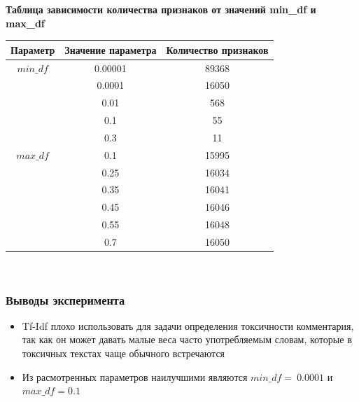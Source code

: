 \begin{center}
	{\bf Таблица зависимости количества признаков от значений min\_df и max\_df}\\
\end{center}

\begin{tabular}{|c|c|c||}
	\hline
		Параметр & Значение параметра & Количество признаков \\
	\hline
	\hline
		$min\_df$
		& 0.00001 & 89368	\\ \cline{2-3}
		& 0.0001 & 16050	\\\cline{2-3}
		& 0.01 & 568		\\\cline{2-3}
		& 0.1 & 55			\\\cline{2-3}
		& 0.3&  11			\\\cline{2-3}
	\hline
	\hline
	\hline
		$max\_df$
		& 0.1 & 15995		\\ \cline{2-3}
		& 0.25 & 16034		\\\cline{2-3}
		& 0.35 & 16041		\\\cline{2-3}
		& 0.45 & 16046		\\\cline{2-3}
		& 0.55&  16048		\\\cline{2-3}
		& 0.7&  16050		\\\cline{2-3}
	\hline
\end{tabular}\\
\subsubsection{Выводы эксперимента}
\begin{itemize}
	\item Tf-Idf плохо использовать для задачи определения токсичности комментария, так как он может давать малые веса часто употребляемым словам, которые в токсичных текстах чаще обычного встречаются
	\item Из расмотренных параметров наилучшими являются $min\_df =~0.0001$ и $max\_df=0.1$ 
\end{itemize}